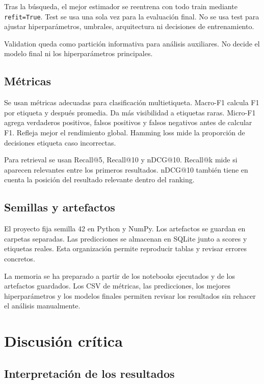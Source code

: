 \documentclass[11pt,a4paper]{article}
\begin{document}
Tras la búsqueda, el mejor estimador se reentrena con todo train mediante \texttt{refit=True}. Test se usa una sola vez para la evaluación final. No se usa test para ajustar hiperparámetros, umbrales, arquitectura ni decisiones de entrenamiento.

Validation queda como partición informativa para análisis auxiliares. No decide el modelo final ni los hiperparámetros principales.

\subsection{Métricas}

Se usan métricas adecuadas para clasificación multietiqueta. Macro-F1 calcula F1 por etiqueta y después promedia. Da más visibilidad a etiquetas raras. Micro-F1 agrega verdaderos positivos, falsos positivos y falsos negativos antes de calcular F1. Refleja mejor el rendimiento global. Hamming loss mide la proporción de decisiones etiqueta caso incorrectas.

Para retrieval se usan Recall@5, Recall@10 y nDCG@10. Recall@k mide si aparecen relevantes entre los primeros resultados. nDCG@10 también tiene en cuenta la posición del resultado relevante dentro del ranking.

\subsection{Semillas y artefactos}

El proyecto fija semilla 42 en Python y NumPy. Los artefactos se guardan en carpetas separadas. Las predicciones se almacenan en SQLite junto a scores y etiquetas reales. Esta organización permite reproducir tablas y revisar errores concretos.

La memoria se ha preparado a partir de los notebooks ejecutados y de los artefactos guardados. Los CSV de métricas, las predicciones, los mejores hiperparámetros y los modelos finales permiten revisar los resultados sin rehacer el análisis manualmente.

\section{Discusión crítica}
\label{sec_discusion}

\subsection{Interpretación de los resultados}
\end{document}
